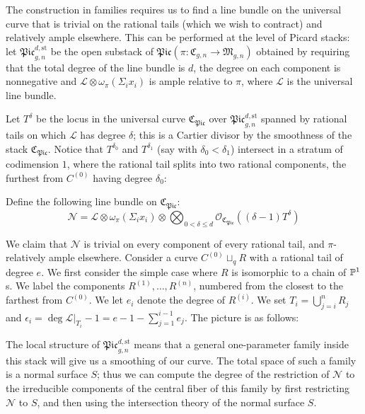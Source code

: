 The construction in families requires us to find a line bundle on the universal curve that is trivial on the rational tails (which we wish to contract) and relatively ample elsewhere. This can be performed at the level of Picard stacks: let $\mathfrak{Pic}_{g,n}^{d,\text{st}}$ be the open substack of $\mathfrak{Pic}(\pi\colon\mathfrak{C}_{g,n}\to\mathfrak{M}_{g,n})$ obtained by requiring that the total degree of the line bundle is $d$, the degree on each component is nonnegative and $\mathcal L\otimes\omega_{\pi}(\Sigma_i x_i)$ is ample relative to $\pi$, where $\mathcal L$ is the universal line bundle.

Let $T^{\delta}$ be the locus in the universal curve $\mathfrak{C}_{\mathfrak{Pic}}$ over $\mathfrak{Pic}_{g,n}^{d,\text{st}}$ spanned by rational tails on which $\mathcal L$ has degree $\delta$; this is a Cartier divisor by the smoothness of the stack $\mathfrak{C}_{\mathfrak{Pic}}$. Notice that $T^{\delta_0}$ and $T^{\delta_1}$ (say with $\delta_0<\delta_1$) intersect in a stratum of codimension $1$, where the rational tail splits into two rational components, the furthest from $C^{(0)}$ having degree $\delta_0$:

\begin{center}

\end{center}
\medskip

Define the following line bundle on $\mathfrak{C}_{\mathfrak{Pic}}$:
\begin{equation*} \mathcal N=\mathcal L\otimes\omega_{\pi}(\Sigma_i x_i)\otimes\bigotimes_{0<\delta\leq d}\mathcal O_{\mathfrak{C}_{\mathfrak{Pic}}}((\delta-1) T^\delta) \end{equation*}

We claim that $\mathcal{N}$ is trivial on every component of every rational tail, and $\pi$-relatively ample elsewhere. Consider a curve $C^{(0)}\sqcup_q R$ with a rational tail of degree $e$. We first consider the simple case where $R$ is isomorphic to a chain of $\mathbb P^1$s. We label the components $R^{(1)},\ldots,R^{(n)}$, numbered from the closest to the farthest from $C^{(0)}$. We let $e_i$ denote the degree of $R^{(i)}$. We set $T_i=\bigcup_{j=i}^n R_j$ and $\epsilon_i=\deg \mathcal{L}|_{T_i} - 1 = e-1-\sum_{j=1}^{i-1} e_j$. The picture is as follows:

\begin{center}

\end{center}

The local structure of $\mathfrak{Pic}_{g,n}^{d,\text{st}}$ means that a general one-parameter family inside this stack will give us a smoothing of our curve. The total space of such a family is a normal surface $S$; thus we can compute the degree of the restriction of $\mathcal{N}$ to the irreducible components of the central fiber of this family by first restricting $\mathcal{N}$ to $S$, and then using the intersection theory of the normal surface $S$.

